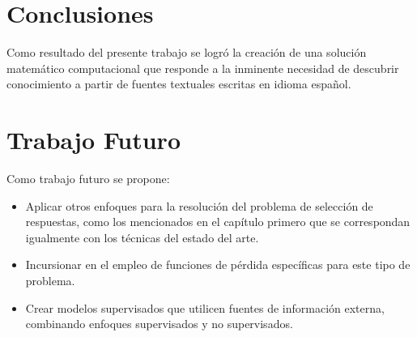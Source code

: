 \chapter*{Conclusiones}\label{chapter:conclusion}

Como resultado del presente trabajo se logró la creación de una solución matemático computacional que responde a la inminente necesidad de descubrir conocimiento a partir de fuentes textuales escritas en idioma español.


\chapter*{Trabajo Futuro}\label{chapter:recomendation}

Como trabajo futuro se propone:

\begin{itemize}
	\item Aplicar otros enfoques para la resolución del problema de selección de respuestas, como los mencionados en el capítulo primero que se correspondan igualmente con los técnicas del estado del arte.
	\item Incursionar en el empleo de funciones de pérdida específicas para este tipo de problema.
    \item Crear modelos supervisados que utilicen fuentes de información externa, combinando enfoques supervisados y no supervisados.
\end{itemize}
